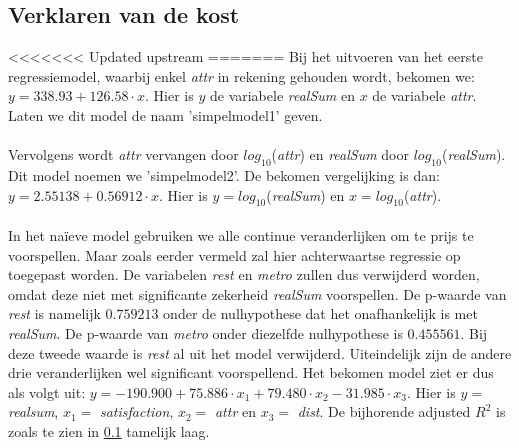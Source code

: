 \documentclass[a4paper]{kulakarticle}
\begin{document}
	\subsection{Verklaren van de kost}
	
<<<<<<< Updated upstream
=======
	Bij het uitvoeren van het eerste regressiemodel, waarbij enkel \textit{attr} in rekening gehouden wordt, bekomen we: 
    $ y = 338.93 + 126.58\cdot x$. Hier is $y$ de variabele \textit{realSum} en $x$ de variabele \textit{attr}. Laten we dit model de naam 'simpelmodel1' geven. \\\\
    
    Vervolgens wordt \textit{attr} vervangen door $log_{10}$(\textit{attr}) en \textit{realSum} door $log_{10}$(\textit{realSum}). Dit model noemen we 'simpelmodel2'. De bekomen vergelijking is dan: $ y = 2.55138 + 0.56912\cdot x$. Hier is $y = log_{10}$(\textit{realSum}) en $x = log_{10}$(\textit{attr}).
	\\\\
	
	In het naïeve model gebruiken we alle continue veranderlijken om te prijs te voorspellen. Maar zoals eerder vermeld zal hier achterwaartse regressie op toegepast worden. De variabelen \textit{rest} en \textit{metro} zullen dus verwijderd worden, omdat deze niet met significante zekerheid \textit{realSum} voorspellen. De p-waarde van \textit{rest} is namelijk $0.759213$ onder de nulhypothese dat het onafhankelijk is met \textit{realSum}. De p-waarde van \textit{metro} onder diezelfde nulhypothese is $0.455561$. Bij deze tweede waarde is \textit{rest} al uit het model verwijderd. Uiteindelijk zijn de andere drie veranderlijken wel significant voorspellend. Het bekomen model ziet er dus als volgt uit: $y = -190.900 + 75.886\cdot x_1 + 79.480\cdot x_2 -31.985\cdot x_3$. Hier is $y =$\textit{realsum}, $x_1 = $ \textit{satisfaction}, $x_2 =$ \textit{attr} en $x_3 =$ \textit{dist}. De bijhorende adjusted $R^2$ is zoals te zien in \ref{} tamelijk laag.\\\\
	
\end{document}
